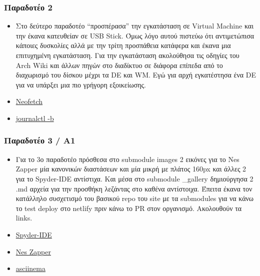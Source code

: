 \hypertarget{ux3c0ux3b1ux3c1ux3b1ux3b4ux3bfux3c4ux3adux3bf-2}{%
\subsubsection{Παραδοτέο
2}\label{ux3c0ux3b1ux3c1ux3b1ux3b4ux3bfux3c4ux3adux3bf-2}}

\begin{itemize}
\tightlist
\item
  Στο δεύτερο παραδοτέο ``προσπέρασα'' την εγκατάσταση σε Virtual
  Machine και την έκανα κατευθείαν σε USB Stick. Όμως λόγο αυτού πιστεύω
  ότι αντιμετώπισα κάποιες δυσκολίες αλλά με την τρίτη προσπάθεια
  κατάφερα και έκανα μια επιτυχημένη εγκατάσταση. Για την εγκατάσταση
  ακολούθησα τις οδηγίες του Arch Wiki και άλλων πηγών στο διαδίκτυο σε
  διάφορα επίπεδα από το διαχωρισμό του δίσκου μέχρι τα DE και WM. Εγώ
  για αρχή εγκατέστησα ένα DE για να υπάρξει μια πιο γρήγορη
  εξοικείωσης.
\item
  \href{https://asciinema.org/a/OSsmgEqcpg0v3x6VSEarRdpzr}{Neofetch}
\item
  \href{https://asciinema.org/a/jFjUeiKxYpEeuyllmpvzREZwd}{journalctl
  -b}
\end{itemize}

\hypertarget{ux3c0ux3b1ux3c1ux3b1ux3b4ux3bfux3c4ux3adux3bf-3-ux3b11}{%
\subsubsection{Παραδοτέο 3 /
Α1}\label{ux3c0ux3b1ux3c1ux3b1ux3b4ux3bfux3c4ux3adux3bf-3-ux3b11}}

\begin{itemize}
\tightlist
\item
  Για το 3ο παραδοτέο πρόσθεσα στο submodule images 2 εικόνες για το Nes
  Zapper μία κανονικών διαστάσεων και μία μικρή με πλάτος 160px και
  άλλες 2 για το Spyder-IDE αντίστιχα. Και μέσα στο submodule \_gallery
  δημιούργησα 2 .md αρχεία για την προσθήκη λεζάντας στο καθένα
  αντίστοιχα. Έπειτα έκανα τον κατάλληλο συσχετισμό του βασικού repo του
  site με τα submodules για να κάνω το test deploy στο netlify πριν κάνω
  το PR στον οργανισμό. Ακολουθούν τα links.
\item
  \href{https://guileless-mandazi-a0b198.netlify.app/gallery/spyder-ide/}{Spyder-IDE}
\item
  \href{https://guileless-mandazi-a0b198.netlify.app/gallery/nes-zapper/}{Nes
  Zapper}
\item
  \href{https://asciinema.org/a/4Z04Mzts6wUXhoxJhooI5d7JX}{asciinema}
\end{itemize}

